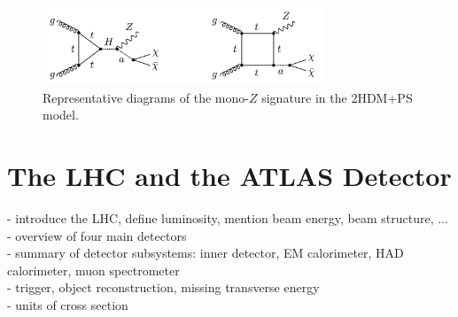 \begin{figure}[htb]
\centering
\includegraphics[width=0.75\textwidth]{Figures/2hdma.png}
\caption{Representative diagrams of the mono-$Z$ signature in the 2HDM+PS model.}
\label{fig:2hdma}
\end{figure}

\clearpage
\section{The LHC and the ATLAS Detector}

- introduce the LHC, define luminosity, mention beam energy, beam structure, ...\\
- overview of four main detectors\\
- summary of detector subsystems: inner detector, EM calorimeter, HAD calorimeter, muon spectrometer\\
- trigger, object reconstruction, missing transverse energy\\
- units of cross section\\